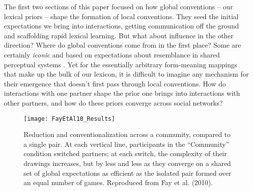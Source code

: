 The first two sections of this paper focused on how global conventions -- our lexical priors -- shape the formation of local conventions. 
They seed the initial expectations we bring into interactions, getting communication off the ground and scaffolding rapid lexical learning. %
But what about influence in the other direction? 
Where do global conventions come from in the first place? Some are certainly \emph{iconic} and based on expectations about resemblance in shared perceptual systems \cite{DingemanseEtAl15_IconicityLanguage,verhoef2016iconicity}.%
Yet for the essentially arbitrary form-meaning mappings that make up the bulk of our lexicon, it is difficult to imagine any mechanism for their emergence that doesn't first pass through local conventions. How do interactions with one partner shape the prior one brings into interactions with other partners, and how do these priors converge across social networks? 

\begin{figure}[t]
\centering
\texttt{[image: FayEtAl10\_Results]}
\caption{Reduction and conventionalization across a community, compared to a single pair. At each vertical line, participants in the ``Community'' condition switched partners; at each switch, the complexity of their drawings increases, but by less and less as they converge on a shared set of global expectations as efficient as the isolated pair formed over an equal number of games. Reproduced from Fay et al. (2010).}
\label{fig:community}
\end{figure}

